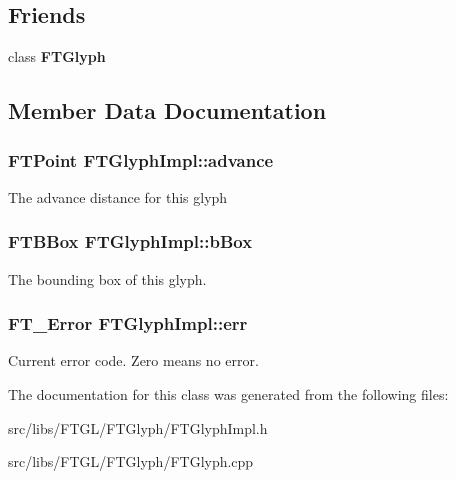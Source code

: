 \subsection*{Friends}
\begin{DoxyCompactItemize}
\item 
\hypertarget{class_f_t_glyph_impl_a908ad68576153727d761f276dd8fd0e2}{
class {\bfseries FTGlyph}}
\label{class_f_t_glyph_impl_a908ad68576153727d761f276dd8fd0e2}

\end{DoxyCompactItemize}


\subsection{Member Data Documentation}
\hypertarget{class_f_t_glyph_impl_acd0a260e13ec1714c2556d24a5352a31}{
\subsubsection[{advance}]{\setlength{\rightskip}{0pt plus 5cm}FTPoint {\bf FTGlyphImpl::advance}}}
\label{class_f_t_glyph_impl_acd0a260e13ec1714c2556d24a5352a31}
The advance distance for this glyph \hypertarget{class_f_t_glyph_impl_a871a6a1a24be465bfae17b7a8e464b3c}{
\subsubsection[{bBox}]{\setlength{\rightskip}{0pt plus 5cm}FTBBox {\bf FTGlyphImpl::bBox}}}
\label{class_f_t_glyph_impl_a871a6a1a24be465bfae17b7a8e464b3c}
The bounding box of this glyph. \hypertarget{class_f_t_glyph_impl_a7a489998b09aef9ceb733604166e933c}{
\subsubsection[{err}]{\setlength{\rightskip}{0pt plus 5cm}FT\_\-Error {\bf FTGlyphImpl::err}}}
\label{class_f_t_glyph_impl_a7a489998b09aef9ceb733604166e933c}
Current error code. Zero means no error. 

The documentation for this class was generated from the following files:\begin{DoxyCompactItemize}
\item 
src/libs/FTGL/FTGlyph/FTGlyphImpl.h\item 
src/libs/FTGL/FTGlyph/FTGlyph.cpp\end{DoxyCompactItemize}
